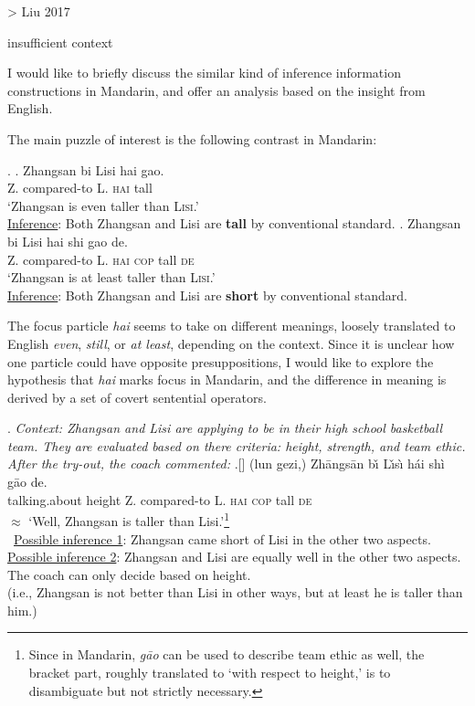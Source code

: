 \documentclass[12pt,letterpaper]{scrartcl}
\begin{document}
> Liu 2017

insufficient context

I would like to briefly discuss the similar kind of inference information constructions in Mandarin, and offer an analysis based on the insight from English.

The main puzzle of interest is the following contrast in Mandarin:

\ex. \label{main}  \ag.  Zhangsan bi Lisi hai gao. \\
		Z. compared-to L. \textsc{hai} tall \\
		`Zhangsan is even taller than \textsc{Lisi}.' \\
		\underline{Inference}: Both Zhangsan and Lisi are \textbf{tall} by conventional standard.  \label{main-hai}
\bg. Zhangsan bi Lisi hai shi gao de. \\
		Z. compared-to L. \textsc{hai} \textsc{cop} tall \textsc{de} \\
		`Zhangsan is at least taller than \textsc{Lisi}.' \\
		\underline{Inference}: Both Zhangsan and Lisi are \textbf{short} by conventional standard.  \label{main-haishide}
		
The focus particle \textit{hai} seems to take on different meanings, loosely translated to English \textit{even}, \textit{still}, or \textit{at least}, depending on the context. Since it is unclear how one particle could have opposite presuppositions, I would like to explore the hypothesis that \textit{hai} marks focus in Mandarin, and the difference in meaning is derived by a set of covert sentential operators.



\setlength{\SubExleftmargin}{0em}
\ex. \textit{Context: Zhangsan and Lisi are applying to be in their high school basketball team. They are evaluated based on there criteria: height, strength, and team ethic. After the try-out, the coach commented:} 
\ag.[] (lun gezi,) Zh\={a}ngs\={a}n b\v{\i} L\v{\i}s\`{\i} h\'{a}i sh\`{i} g\={a}o de. \\
    		talking.about height Z. compared-to L. \textsc{hai} \textsc{cop} tall \textsc{de} \\
    		$\approx$ `Well, Zhangsan is taller than Lisi.'\footnote{Since in Mandarin, \textit{g\={a}o} can be used to describe team ethic as well, the bracket part, roughly translated to `with respect to height,' is to disambiguate but not strictly necessary.} \\\
    		\underline{Possible inference 1}: Zhangsan came short of Lisi in the other two aspects. \\
    		\underline{Possible inference 2}: Zhangsan and Lisi are equally well in the other two aspects. The coach can only decide based on height. \\
    		(i.e., Zhangsan is not better than Lisi in other ways, but at least he is taller than him.) \label{crucial2}
\end{document}
